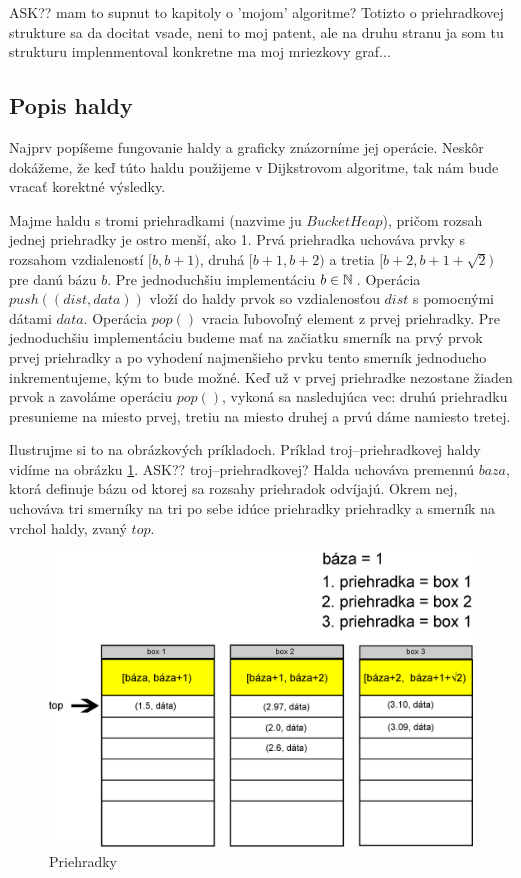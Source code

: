 ASK?? mam to supnut to kapitoly o 'mojom' algoritme?
Totizto o priehradkovej strukture sa da docitat vsade, neni
to moj patent, ale na druhu stranu ja som tu strukturu implenmentoval konkretne ma moj mriezkovy graf...


\subsection{Popis haldy}
Najprv popíšeme fungovanie haldy a graficky znázorníme jej 
operácie. Neskôr dokážeme, že keď túto haldu použijeme v Dijkstrovom algoritme, tak nám bude vracať korektné výsledky.

Majme haldu s tromi priehradkami (nazvime ju $BucketHeap$), pričom rozsah jednej priehradky je ostro menší, ako 1.
Prvá priehradka uchováva prvky s rozsahom vzdialeností $ [b, b+1) $, druhá $ [b+1, b+2) $ a tretia $ [b+2, b+1+\sqrt{2}) $
pre danú bázu $ b $. Pre jednoduchšiu implementáciu $b \in \mathbb{N}\,$. Operácia $push((dist, data))$ vloží do haldy prvok so vzdialenosťou $dist$ 
s pomocnými dátami $data$. Operácia $pop()$ vracia ľubovoľný element z prvej priehradky. 
Pre jednoduchšiu implementáciu budeme mať na začiatku smerník na prvý prvok prvej priehradky a po vyhodení najmenšieho prvku tento smerník jednoducho inkrementujeme, kým to bude možné. Keď už v prvej priehradke nezostane žiaden prvok a zavoláme operáciu $pop()$, vykoná sa nasledujúca vec: druhú priehradku presunieme na miesto prvej, tretiu na miesto druhej a prvú dáme namiesto tretej.

Ilustrujme si to na obrázkových príkladoch. Príklad troj--priehradkovej haldy vidíme na obrázku \ref{fig:priehradky}.
ASK?? troj--priehradkovej? 
Halda uchováva premennú $ baza $, ktorá definuje bázu od ktorej sa rozsahy priehradok odvíjajú. Okrem
nej, uchováva tri smerníky na tri po sebe idúce priehradky priehradky a smerník na vrchol haldy, zvaný $ top $.



\begin{figure}[h]
\centering
\includegraphics[width=\textwidth]{./img/priehradky_naplnene_default.eps}
\caption{Priehradky}
\label{fig:priehradky}
\end{figure}

